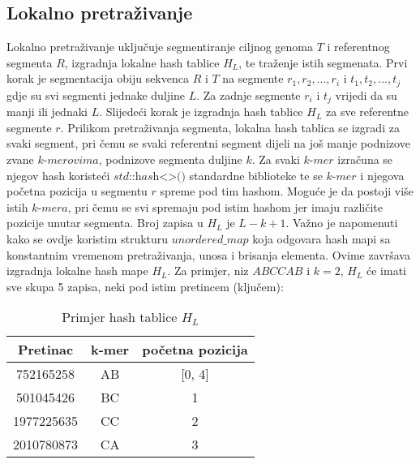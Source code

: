 \documentclass[times, utf8, diplomski]{fer}
\begin{document}
\subsection{Lokalno pretraživanje}
Lokalno pretraživanje uključuje segmentiranje ciljnog genoma $\textit{T}$ i referentnog segmenta $\textit{R}$, izgradnja lokalne hash tablice $\textit{H}_L$, te traženje istih segmenata. Prvi korak je segmentacija obiju sekvenca $\textit{R}$ i $\textit{T}$ na segmente $r_1, r_2,..., r_i$ i $t_1, t_2,..., t_j$ gdje su svi segmenti jednake duljine $L$.  Za zadnje segmente $r_i$ i $t_j$ vrijedi da su manji ili jednaki $L$. Slijedeći korak je izgradnja hash tablice $\textit{H}_L$ za sve referentne segmente $r$. Prilikom pretraživanja segmenta, lokalna hash tablica se izgradi za svaki segment, pri čemu se svaki referentni segment dijeli na još manje podnizove zvane $\textit{k-merovima}$, podnizove segmenta duljine $k$. Za svaki $\textit{k-mer}$ izračuna se njegov hash koristeći $\textit{std::hash<>()}$ standardne biblioteke te se $\textit{k-mer}$ i njegova početna pozicija u segmentu $r$ spreme pod tim hashom. Moguće je da postoji više istih $\textit{k-mera}$, pri čemu se svi spremaju pod istim hashom jer imaju različite pozicije unutar segmenta. Broj zapisa u $\textit{H}_L$ je $L - k  + 1$. Važno je napomenuti kako se ovdje koristim strukturu $\textit{unordered\_map}$ koja odgovara hash mapi sa konstantnim vremenom pretraživanja, unosa i brisanja elementa. Ovime završava izgradnja lokalne hash mape $\textit{H}_L$. Za primjer, niz $\textit{ABCCAB}$ i $k = 2$, $\textit{H}_L$ će imati sve skupa 5 zapisa, neki pod istim pretincem (ključem):
\begin{table} [!h]
\centering
\begin{tabular}{|c || c | c|}
\hline
Pretinac & k-mer & početna pozicija \\
\hline
752165258 & AB & [0, 4] \\
\hline
501045426 & BC & 1 \\
\hline 
1977225635 & CC & 2 \\
\hline
2010780873 & CA & 3 \\
\hline
\end{tabular}
\caption{Primjer hash tablice $\textit{H}_L$}
\end{table}
\end{document}
